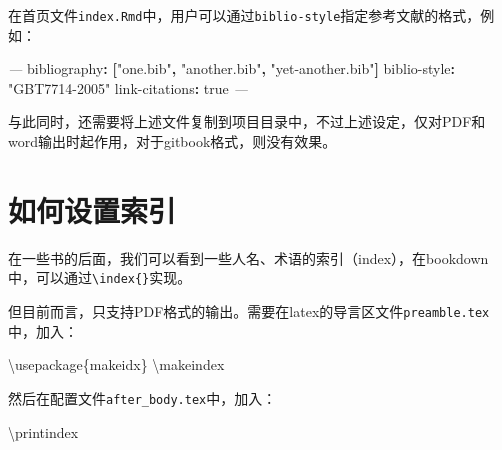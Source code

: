\documentclass[]{ctexbook}
\newenvironment{Shaded}{\begin{snugshade}}{\end{snugshade}}
\newcommand{\AttributeTok}[1]{\textcolor[rgb]{0.77,0.63,0.00}{#1}}
\newcommand{\BuiltInTok}[1]{#1}
\newcommand{\CharTok}[1]{\textcolor[rgb]{0.31,0.60,0.02}{#1}}
\newcommand{\ExtensionTok}[1]{#1}
\newcommand{\FunctionTok}[1]{\textcolor[rgb]{0.00,0.00,0.00}{#1}}
\newcommand{\KeywordTok}[1]{\textcolor[rgb]{0.13,0.29,0.53}{\textbf{#1}}}
\newcommand{\NormalTok}[1]{#1}
\newcommand{\PreprocessorTok}[1]{\textcolor[rgb]{0.56,0.35,0.01}{\textit{#1}}}
\newcommand{\StringTok}[1]{\textcolor[rgb]{0.31,0.60,0.02}{#1}}
\begin{document}
在首页文件\texttt{index.Rmd}中，用户可以通过\texttt{biblio-style}指定参考文献的格式，例如：

\begin{Shaded}
\begin{Highlighting}[]
\PreprocessorTok{---}
\FunctionTok{bibliography}\KeywordTok{:}\AttributeTok{ }\KeywordTok{[}\StringTok{"one.bib"}\KeywordTok{,}\AttributeTok{ }\StringTok{"another.bib"}\KeywordTok{,}\AttributeTok{ }\StringTok{"yet-another.bib"}\KeywordTok{]}
\FunctionTok{biblio-style}\KeywordTok{:}\AttributeTok{ }\StringTok{"GBT7714-2005"}
\FunctionTok{link-citations}\KeywordTok{:}\AttributeTok{ }\CharTok{true}
\PreprocessorTok{---}
\end{Highlighting}
\end{Shaded}

与此同时，还需要将上述文件复制到项目目录中，不过上述设定，仅对PDF和word输出时起作用，对于gitbook格式，则没有效果。

\hypertarget{ux5982ux4f55ux8bbeux7f6eux7d22ux5f15}{%
\section{如何设置索引}\label{ux5982ux4f55ux8bbeux7f6eux7d22ux5f15}}

在一些书的后面，我们可以看到一些人名、术语的索引（index），在bookdown中，可以通过\texttt{\textbackslash{}index\{\}}实现。

但目前而言，只支持PDF格式的输出。需要在latex的导言区文件\texttt{preamble.tex}中，加入：

\begin{Shaded}
\begin{Highlighting}[]
\BuiltInTok{\textbackslash{}usepackage}\NormalTok{\{}\ExtensionTok{makeidx}\NormalTok{\}}
\FunctionTok{\textbackslash{}makeindex}
\end{Highlighting}
\end{Shaded}

然后在配置文件\texttt{after\_body.tex}中，加入：

\begin{Shaded}
\begin{Highlighting}[]
\FunctionTok{\textbackslash{}printindex}
\end{Highlighting}
\end{Shaded}



\backmatter
\printindex
\end{document}
